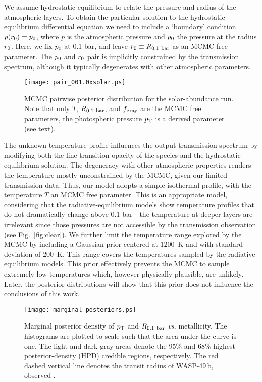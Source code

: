 \documentclass[tighten, times, twocolumn]{aastex61}  %
\let\oldmsb=\sb
\def\sb#1{\ifmmode
           \oldmsb{#1}%
         \else\strut\raise-.54ex\hbox{\scriptsize #1}\fi}
\newcommand\vs{\emph{vs.}}
\begin{document}
We assume hydrostatic equilibrium to relate the pressure and radius of
the atmospheric layers.  To obtain the particular solution to the
hydrostatic-equilibrium differential equation we need to include a
`boundary' condition $p(r\sb{0}) = p\sb{0}$, where $p$ is the atmospheric
pressure and $p\sb{0}$ the pressure at the radius $r\sb{0}$.  Here, we
fix $p\sb{0}$ at 0.1 bar,
and leave $r\sb{0} \equiv R\sb{0.1\ {\rm bar}}$ as an MCMC free
parameter.  The $p\sb{0}$ and $r\sb{0}$ pair is implicitly constrained
by the transmission spectrum, although it typically degenerates with
other atmospheric parameters.

\begin{figure}[t]
\centering
\texttt{[image: pair\_001.0xsolar.ps]}
\caption{MCMC pairwise posterior distribution for the solar-abundance
run.  Note that only $T$, $R\sb{0.1\ {\rm bar}}$, and $f\sb{\rm gray}$
are the MCMC free parameters, the photospheric pressure $p\sb{\rm T}$
is a derived parameter (see text).}
\label{fig:solarpair}
\end{figure}

The unknown temperature profile influences the output transmission
spectrum by modifying both the line-transition opacity of the species
and the hydrostatic-equilibrium solution.  The degeneracy with other
atmospheric properties renders the temperature mostly unconstrained by
the MCMC, given our limited transmission data.  Thus, our model adopts
a simple isothermal profile, with the temperature $T$ an MCMC free
parameter.  This is an appropriate model, considering that the
radiative-equilibrium models show temperature profiles that do not
dramatically change above 0.1 bar---the temperature at deeper layers
are irrelevant since those pressures are not accessible by the
transmission observation (see Fig.\ \ref{fig:clear}).  We further
limit the temperature range explored by the MCMC by including a
Gaussian prior centered at $1200$~K and with standard deviation of
$200$~K.  This range covers the temperatures sampled by the
radiative-equilibrium models.  This prior effectively prevents the
MCMC to sample extremely low temperatures which, however physically
plausible, are unlikely.  Later, the posterior distributions will show
that this prior does not influence the conclusions of this
work.


\begin{figure}[t]
\centering
\texttt{[image: marginal\_posteriors.ps]}
\caption{Marginal posterior density of $p\sb{\rm T}$ and
$R\sb{0.1\ {\rm bar}}$ {\vs} metallicity.  The histograms are plotted
to scale such that the area under the curve is one.  The light and
dark gray areas denote the 95\% and 68\% highest-posterior-density (HPD)
credible regions, respectively.  The red dashed vertical line denotes the
 transit radius of WASP-49\,b, observed .}
\label{fig:marginalZ}
\end{figure}
\end{document}
